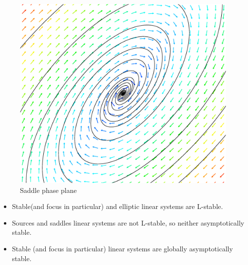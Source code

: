 \begin{figure}[H]
    \centering
    \includegraphics[scale=0.3]{images/spirale.eps}
    \caption{Saddle phase plane}
    \label{fig:spirale}
\end{figure}
\begin{corollaire}
\quad
\begin{itemize} 
    \item Stable(and focus in particular) and elliptic linear systems are L-stable.
    \item Sources and saddles linear systems are not L-stable, so  neither asymptotically stable.
    \item Stable (and focus in particular) linear systems are globally asymptotically stable.
    \end{itemize} 
\end{corollaire}


